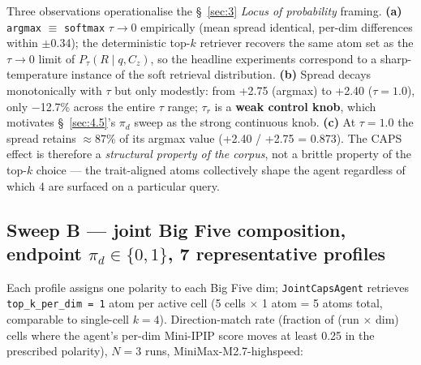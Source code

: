 Three observations operationalise the \S~\ref{sec:3} \textit{Locus of probability} framing. \textbf{(a)} \texttt{argmax} $\equiv$ \texttt{softmax} $\tau \to 0$ empirically (mean spread identical, per-dim differences within $\pm$0.34); the deterministic top-$k$ retriever recovers the same atom set as the $\tau \to 0$ limit of $P_\tau(R \mid q, C_z)$, so the headline experiments correspond to a sharp-temperature instance of the soft retrieval distribution. \textbf{(b)} Spread decays monotonically with $\tau$ but only modestly: from +2.75 (argmax) to +2.40 ($\tau = 1.0$), only $-$12.7\% across the entire $\tau$ range; $\tau_r$ is a \textbf{weak control knob}, which motivates \S~\ref{sec:4.5}'s $\pi_d$ sweep as the strong continuous knob. \textbf{(c)} At $\tau = 1.0$ the spread retains $\approx$87\% of its argmax value (+2.40 / +2.75 = 0.873). The CAPS effect is therefore a \textit{structural property of the corpus}, not a brittle property of the top-$k$ choice --- the trait-aligned atoms collectively shape the agent regardless of which 4 are surfaced on a particular query.

\subsection{Sweep B --- joint Big Five composition, endpoint $\pi_d \in \{0,1\}$, 7 representative profiles}
\label{app:C.2}

Each profile assigns one polarity to each Big Five dim; \texttt{JointCapsAgent} retrieves \texttt{top\_\allowbreak{}k\_\allowbreak{}per\_\allowbreak{}dim = 1} atom per active cell (5 cells $\times$ 1 atom = 5 atoms total, comparable to single-cell $k = 4$). Direction-match rate (fraction of (run $\times$ dim) cells where the agent's per-dim Mini-IPIP score moves at least 0.25 in the prescribed polarity), $N = 3$ runs, MiniMax-M2.7-highspeed:

